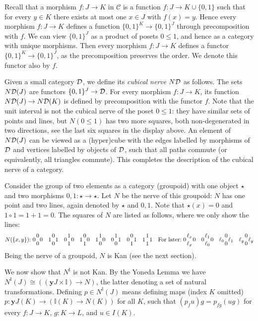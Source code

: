 \documentclass[10pt,a4paper]{article}
\newcommand{\CC}{{\mathcal C}}
\newcommand{\set}[1]{\{#1\}}
\newcommand{\yoneda}{\mathbf{y}}
\newcommand{\interval}{\mathbb{I}}
\newcommand{\DD}{{\cal D}}
\newcommand{\ND}{N\DD}
\begin{document}
Recall that a morphism $f:J\to K$ in $\CC$ is a function $f:J\to
K\cup\set{0,1}$ such that for every $y\in K$ there exists at most one
$x\in J$ with $f(x)=y$.  Hence every morphism $f:J\to K$ defines a
function $\set{0,1}^K \to \set{0,1}^J$ through precomposition with
$f$.  We can view $\set{0,1}^J$ as a product of posets $0\leq1$, and
hence as a category with unique morphisms.  Then every morphism
$f:J\to K$ defines a functor $\set{0,1}^K \to \set{0,1}^J$, as the
precomposition preserves the order.  We denote this functor also by
$f$.

Given a small category $\DD$, we define its \emph{cubical nerve} $\ND$
as follows. The sets $\ND(J)$ are functors $\set{0,1}^J \to\DD$.  For
every morphism $f:J\to K$, its function $\ND(J)\to\ND(K)$ is defined
by precomposition with the functor $f$.  Note that the unit interval
is not the cubical nerve of the poset $0\leq1$: they have similar sets
of points and lines, but $N(0\leq1)$ has two more squares, both
non-degenerated in two directions, see the last six squares in the
display above.  An element of $\ND(J)$ can be viewed as a (hyper)cube
with the edges labelled by morphisms of $\DD$ and vertices labelled by
objects of $\DD$, such that all paths commute (or equivalently, all
triangles commute).  This completes the description of the cubical
nerve of a category.

Consider the group of two elements as a category (groupoid) with one
object $\star$ and two morphisms $0,1:\star\to\star$.  Let $N$ be the
nerve of this groupoid: $N$ has one point and two lines, again denoted
by $\star$ and $0,1$.  Note that $\star(x) = 0$ and $1\circ 1 =
1+1=0$.  The squares of $N$ are listed as follows, where we only show
the lines:
\[
\def\ol{{1 \atop 0}}
\def\oo{{0 \atop 0}}
\def\lo{{0 \atop 1}}
\def\ll{{1 \atop 1}}
N(\set{x,y}){:}~
0\oo0 \quad 1\oo1 \quad 0\ll0 \quad 1\lo0 \quad 1\ol0 \quad 0\ol1 \quad 0\lo1 \quad 1\ll1
\quad\mbox{For later:}~0{\ell_x \atop \ell_x}0 \quad 0{\ell_1 \atop \ell_0}0
\quad \ell_0{0 \atop 0}\ell_1 \quad \ell_y{0 \atop 0}\ell_y\]
Being the nerve of a groupoid, $N$ is Kan (see the next section).

We now show that $N^\interval$ is not Kan. By the Yoneda Lemma we have
$N^\interval(J)\cong ((\yoneda J \times \interval) \to N)$, the
latter denoting a set of natural transformations.  
Defining $p\in N^\interval(J)$ means defining maps (index $K$ omitted)
$p :\yoneda J (K) \to (\interval(K) \to N(K))$ for all $K$,
such that $(p_f u) g = p_{fg}(ug)$ 
for every $f:J\to K$, $g:K\to L$, and $u\in I(K)$.
\end{document}
